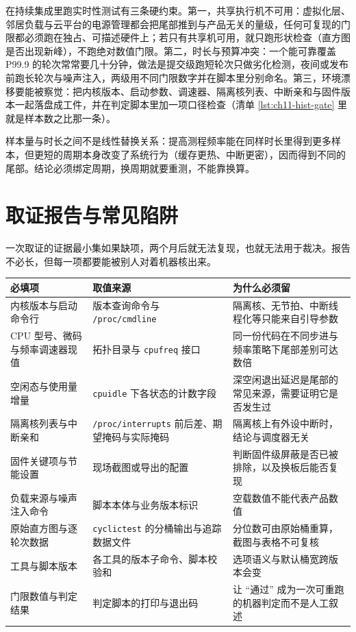 \documentclass[12pt,a4paper,fontset=fandol]{ctexbook}
\newcommand{\Tp}[1]{\texttt{#1}}
\begin{document}
在持续集成里跑实时性测试有三条硬约束。第一，共享执行机不可用：虚拟化层、邻居负载与云平台的电源管理都会把尾部推到与产品无关的量级，任何可复现的门限都必须跑在独占、可描述硬件上；若只有共享机可用，就只跑形状检查（直方图是否出现新峰），不跑绝对数值门限。第二，时长与预算冲突：一个能可靠覆盖 P99.9 的轮次常常要几十分钟，做法是提交级跑短轮次只做劣化检测，夜间或发布前跑长轮次与噪声注入，两级用不同门限数字并在脚本里分别命名。第三，环境漂移要能被察觉：把内核版本、启动参数、调速器、隔离核列表、中断亲和与固件版本一起落盘成工件，并在判定脚本里加一项口径检查（清单 \ref{lst:ch11-hist-gate} 里就是样本数之比那一条）。

样本量与时长之间不是线性替换关系：提高测程频率能在同样时长里得到更多样本，但更短的周期本身改变了系统行为（缓存更热、中断更密），因而得到不同的尾部。结论必须绑定周期，换周期就要重测，不能靠换算。

\section{取证报告与常见陷阱}

一次取证的证据最小集如果缺项，两个月后就无法复现，也就无法用于裁决。报告不必长，但每一项都要能被别人对着机器核出来。

\begin{center}
\begin{tabular}{>{\raggedright\arraybackslash}p{} >{\raggedright\arraybackslash}p{} >{\raggedright\arraybackslash}p{}}
\toprule
必填项 & 取值来源 & 为什么必须留 \\
\midrule
内核版本与启动命令行 & 版本查询命令与 \Tp{/proc/cmdline} & 隔离核、无节拍、中断线程化等只能来自引导参数 \\
CPU 型号、微码与频率调速器现值 & 拓扑目录与 \Tp{cpufreq} 接口 & 同一份代码在不同步进与频率策略下尾部差别可达数倍 \\
空闲态与使用量增量 & \Tp{cpuidle} 下各状态的计数字段 & 深空闲退出延迟是尾部的常见来源，需要证明它是否发生过 \\
隔离核列表与中断亲和 & \Tp{/proc/interrupts} 前后差、期望掩码与实际掩码 & 隔离核上有外设中断时，结论与调度器无关 \\
固件关键项与节能设置 & 现场截图或导出的配置 & 判断固件级屏蔽是否已被排除，以及换板后能否复现 \\
负载来源与噪声注入命令 & 脚本本体与业务版本标识 & 空载数值不能代表产品数值 \\
原始直方图与逐轮次数据 & \Tp{cyclictest} 的分桶输出与追踪数据文件 & 分位数可由原始桶重算，截图与表格不可复核 \\
工具与脚本版本 & 各工具的版本子命令、脚本校验和 & 选项语义与默认桶宽跨版本会变 \\
门限数值与判定结果 & 判定脚本的打印与退出码 & 让 ``通过'' 成为一次可重跑的机器判定而不是人工叙述 \\
\bottomrule
\end{tabular}
\end{center}
\end{document}
